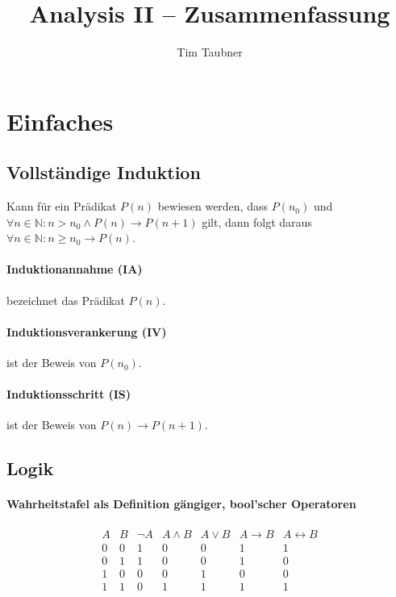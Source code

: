 \documentclass[a4paper, 9pt, DIV=24]{scrartcl}
\title{Analysis II -- Zusammenfassung}
\author{Tim Taubner}
\newcommand{\N}{\mathbb{N}}
\begin{document}
\pagestyle{fancy}
\fancyhf{}

\begin{twocolumn}
\tableofcontents
\end{twocolumn}

\clearpage

\section{Einfaches}

\subsection{Vollständige Induktion}
Kann für ein Prädikat $P(n)$ bewiesen werden, dass $P(n_0)$ und $\forall n\in\N: n > n_0 \wedge P(n) \rightarrow P(n+1)$ gilt,
dann folgt daraus $\forall n\in\N: n \geq n_0 \rightarrow P(n)$.
\paragraph{Induktionannahme (IA)} bezeichnet das Prädikat $P(n)$.
\paragraph{Induktionsverankerung (IV)} ist der Beweis von $P(n_0)$.
\paragraph{Induktionsschritt (IS)} ist der Beweis von $P(n) \rightarrow P(n+1)$.

\subsection{Logik}
\paragraph{Wahrheitstafel als Definition gängiger, bool'scher Operatoren}
\[
\begin{array}{ccccccc}
A&B&\neg A&A \wedge B&A \vee B & A \rightarrow B & A \leftrightarrow B \\\hline
0&0&1&0&0&1&1\\\hline
0&1&1&0&0&1&0\\\hline
1&0&0&0&1&0&0\\\hline
1&1&0&1&1&1&1\\
\end{array}
\]
\end{document}
